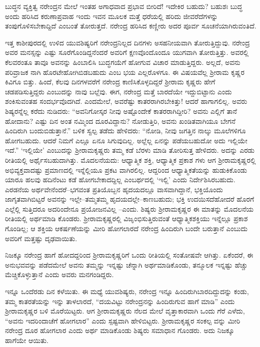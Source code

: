 ಬುದ್ಧನ ವ್ಯಕ್ತಿತ್ವ ನರೇಂದ್ರನ ಮೇಲೆ ಇಂತಹ ಅಗಾಧವಾದ ಪ್ರಭಾವ ಬೀರಿದೆ! ಇದೇಕಿರ ಬಹುದು? ಬಹುಶಃ ಬುದ್ಧ ಅಂದು ಹರಿಸಿದ ಕರುಣಾಪ್ರವಾಹ ಇಂದು ಇವನ ಮೂಲಕ ಮತ್ತೆ ಧರೆಯಲ್ಲಿ ಹರಿದು ಜೀವರೆದೆಗಳನ್ನು ತಂಪುಗೊಳಿಸಬೇಕಾದ್ದಿದೆ ಎಂಬಂತೆ ತೋರುತ್ತದೆ. ನರೇಂದ್ರ ಹರಿಸಿದ ಕಣ್ಣೀರು ಅದರ ಪೂರ್ವ ಸೂಚನೆಯಾಗಿರುವಂತಿದೆ.

ಇತ್ತ ಕಾಶೀಪುರದಲ್ಲಿ ಉಳಿದ ಯುವಶಿಷ್ಯರಿಗೆ ನರೇಂದ್ರನಿಲ್ಲದ ದಿನಗಳು ಅಸಹನೀಯವಾಗಿ ತೋರುತ್ತಿದ್ದುವು. ನರೇಂದ್ರ ಅವರ ಮನಸ್ಸನ್ನು ಎಷ್ಟು ಸೂರೆಗೊಂಡಿದ್ದನೆಂದರೆ ಅವರಿಗೆ ಕ್ಷಣವೊಂದೊಂದೂ ಯುಗವಾಗಿ ತೋರುತ್ತಿತ್ತು. ಅವರಲ್ಲಿ ಕೆಲವರಂತೂ ತಾವೂ ಅವನನ್ನು ಹಿಂಬಾಲಿಸಿ ಬುದ್ಧಗಯೆಗೆ ಹೋಗುವ ವಿಚಾರ ಮಾಡುತ್ತಿದ್ದರು. ಅಲ್ಲದೆ, ಅವನು ಪರಿವ್ರಾಜಕ ನಾಗಿ ಹೊರಟೇಹೋಗಿಬಿಡಬಹುದು ಎಂಬ ಭಯ ಎಲ್ಲರೊಳಗೂ. ಈ ವಿಷಯವೆಲ್ಲ ಶ್ರೀರಾಮ ಕೃಷ್ಣರ ಕಿವಿಗೂ ಬಿತ್ತು. ಹಿಂದೆ, ಕೆಲವು ದಿನಗಳವರೆಗೆ ನರೇಂದ್ರ ಕಾಣಿಸಿಕೊಳ್ಳದಿದ್ದರೆ ಶ್ರೀರಾಮ ಕೃಷ್ಣರು ಹೇಗೆ ಚಡಪಡಿಸುತ್ತಿದ್ದರು ಎಂಬುದನ್ನು ನಾವು ಬಲ್ಲೆವು. ಈಗ, ನರೇಂದ್ರ ಮತ್ತೆ ಬಾರದೆಯೇ ಇದ್ದುಬಿಟ್ಟಾನು ಎಂದು ಶಂಕಿಸುವಂತಹ ಸಂದರ್ಭವೊದಗಿದೆ. ಎಂದಮೇಲೆ, ಅವರೆಷ್ಟು ಕಾತರರಾಗಿರಬೇಕಿತ್ತು! ಆದರೆ ಹಾಗಾಗಲಿಲ್ಲ. ಅವರು ಶಿಷ್ಯರನ್ನೆಲ್ಲ ಕರೆದು ನುಡಿದರು: “ಅವನಿಗೋಸ್ಕರ ನೀವು ಅಷ್ಟೊಂದೇಕೆ ಕಾತರರಾಗಿದ್ದೀರಿ? ಅವನು ಎಲ್ಲಿಗೆ ತಾನೆ ಹೋದಾನು? ಎಷ್ಟು ದಿನ ಅಂತ ನಮ್ಮಿಂದ ದೂರವಿದ್ದಾನು? ನೋಡುತ್ತಿರಿ, ಅವನು ಖಂಡಿತವಾಗಿಯೂ ಬೇಗನೆ ಹಿಂದಿರುಗಿ ಬಂದುಬಿಡುತ್ತಾನೆ.” ಬಳಿಕ ಸ್ವಲ್ಪ ತಡೆದು ಹೇಳಿದರು: “ನೋಡಿ, ನೀವು ಜಗತ್ತಿನ ನಾಲ್ಕು ಮೂಲೆಗಳಿಗೂ ಹೋಗಬಹುದು. ಆದರೆ ನಿಮಗೆ ಎಲ್ಲೂ ಏನೂ ಸಿಗುವುದಿಲ್ಲ. ಅಲ್ಲೆಲ್ಲ ಏನನ್ನು ಪಡೆಯಬಹುದೋ ಅದು ಇಲ್ಲಿಯೇ ಇದೆ.” ‘ಇಲ್ಲಿಯೇ’ ಎಂಬುದನ್ನು ಶ್ರೀರಾಮಕೃಷ್ಣರು ತಮ್ಮ ಕಡೆ ಬೆರಳು ಮಾಡಿ ತೋರಿಸುತ್ತ ಹೇಳಿದರು. ಅದನ್ನು ಎರಡು ರೀತಿಯಲ್ಲಿ ಅರ್ಥೈಸಬಹುದಾಗಿತ್ತು. ಮೊದಲನೆಯದು: ಆಧ್ಯಾತ್ಮಿಕ ಶಕ್ತಿ, ಆಧ್ಯಾತ್ಮಿಕ ಪ್ರಕಾಶ ಗಳು ಆಗ ಶ್ರೀರಾಮಕೃಷ್ಣರಲ್ಲಿ ಅಭಿವ್ಯಕ್ತವಾದಷ್ಟು ಪ್ರಮಾಣದಲ್ಲಿ ಇನ್ನೆಲ್ಲಿಯೂ ಪ್ರಕಟ ವಾಗಿರಲಿಲ್ಲ. ಆದ್ದರಿಂದ ಆಧ್ಯಾತ್ಮಿಕತೆಯನ್ನು ಹುಡುಕಿಕೊಂಡು ಯಾರೂ ಹಲವು ಹದಿನೆಂಟು ಕಡೆ ಹೋಗಬೇಕಾದದ್ದಿಲ್ಲ ಎಂಬರ್ಥದಲ್ಲಿ ‘ಇಲ್ಲಿ’ ಎಂದು ನಿರ್ದೇಶಿಸಿರಬಹುದು. ಎರಡನೆಯ ಅರ್ಥವೇನೆಂದರೆ–ಭಗವಂತ ಪ್ರತಿಯೊಬ್ಬನ ಹೃದಯದಲ್ಲೂ ವಾಸವಾಗಿದ್ದಾನೆ, ಭಕ್ತಿಯೊಂದು ಜಾಗೃತವಾಗಿಬಿಟ್ಟರೆ ಅವನನ್ನು ಇಲ್ಲೇ–ತಮ್ಮತಮ್ಮ ಹೃದಯದಲ್ಲೇ–ಕಾಣಬಹುದು; ಭಕ್ತಿ ಉದಯಿಸದೆಹೋದರೆ ಹೊರಗೆ ಎಲ್ಲೆಲ್ಲಿ ಸುತ್ತಿದರೂ ಅದರಿಂದೇನೂ ಪ್ರಯೋಜನವಿಲ್ಲ –ಎಂದು. ಶಿಷ್ಯರು ಶ್ರೀರಾಮಕೃಷ್ಣರ ಈ ಮಾತನ್ನು ಮೊದಲನೆಯ ರೀತಿಯಲ್ಲಿ ಅರ್ಥಮಾಡಿ ಕೊಂಡರು. ಶ್ರೀರಾಮಕೃಷ್ಣರಲ್ಲಿ ವಿಜೃಂಭಿಸುತ್ತಿರುವಂತೆ ಆಧ್ಯಾತ್ಮಿಕಶಕ್ತಿಯು ಇನ್ನೆಲ್ಲೂ ಪ್ರಕಾಶ ಗೊಂಡಿಲ್ಲ; ಆ ಶಕ್ತಿಯ ಆಕರ್ಷಣೆಯನ್ನು ಮೀರಿ ಹೋಗಲಾರದೆ ನರೇಂದ್ರ ಹಿಂದಿರುಗಿ ಬಂದೇ ಬರುತ್ತಾನೆ ಎಂಬುದು ಅವರಿಗೆ ಮತ್ತಷ್ಟು ದೃಢವಾಯಿತು.

ನಿಜಕ್ಕೂ ನರೇಂದ್ರ ಹಾಗೆ ಹೋದದ್ದರಿಂದ ಶ್ರೀರಾಮಕೃಷ್ಣರಿಗೆ ಒಂದು ರೀತಿಯಲ್ಲಿ ಸಂತೋಷವೇ ಆಗಿತ್ತು. ಏಕೆಂದರೆ, ಈ ಅನುಭವವನ್ನು ಪಡೆದಮೇಲೆ ಅವನು ತಮ್ಮನ್ನು ಇನ್ನಷ್ಟು ಚೆನ್ನಾಗಿ ಅರ್ಥಮಾಡಿಕೊಂಡು, ತನ್ಮೂಲಕ ಇನ್ನಷ್ಟು ಹೆಚ್ಚು ಮೆಚ್ಚಿಕೊಳ್ಳುತ್ತಾನೆ ಎಂದು ಅವರು ಮನಗಂಡಿದ್ದರು.

ಇನ್ನೂ ಒಂದೆರಡು ದಿನ ಕಳೆಯಿತು. ಈ ಮಧ್ಯೆ ಯುವಶಿಷ್ಯರು, ನರೇಂದ್ರ ಇನ್ನೂ ಹಿಂದಿರುಗಿಬಾರದಿದ್ದುದನ್ನು ಕಂಡು, ತಮ್ಮ ಕಾತರತೆಯನ್ನು ಇನ್ನು ತಾಳಲಾರದೆ, “ದಯವಿಟ್ಟು ನರೇಂದ್ರನನ್ನು ಹಿಂದಿರುಗುವ ಹಾಗೆ ಮಾಡಿ” ಎಂದು ಶ್ರೀರಾಮಕೃಷ್ಣರ ಬಳಿ ಮೊರೆಯಿಟ್ಟರು. ಆಗ ಶ್ರೀರಾಮಕೃಷ್ಣರು ನೆಲದ ಮೇಲೆ ವೃತ್ತಾಕಾರವಾಗಿ ಒಂದು ಗೆರೆ ಎಳೆದು, “ಅವನು ಇದರಿಂದಾಚೆಗೆ ಹೋಗಲಾರ” ಎಂದು ಸ್ಪಷ್ಟವಾಗಿ ಹೇಳಿಬಿಟ್ಟರು. ಶ್ರೀರಾಮಕೃಷ್ಣರ ಸಂಕಲ್ಪ ವನ್ನು ಮೀರಿ ನರೇಂದ್ರ ದೂರ ಹೋಗಲಾರ ಎಂದು ಅರ್ಥ ಮಾಡಿಕೊಂಡು ಶಿಷ್ಯರು ಸಮಾಧಾನ ಗೊಂಡರು. ಅದು ನಿಜಕ್ಕೂ ಹಾಗೆಯೇ ಆಯಿತು.

